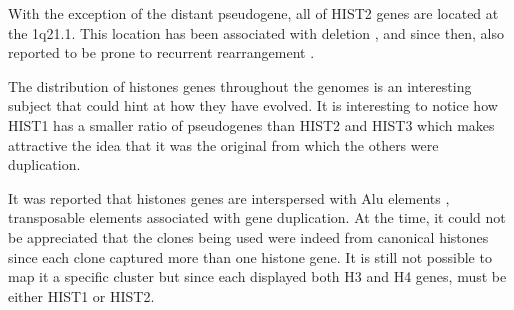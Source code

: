 
    With the exception of the distant pseudogene, all of HIST2 genes are located
    at the 1q21.1. This location has been associated with deletion
    \citep{HISTTwo-prone-deletion-discovery}, and since then, also reported to be prone
    to recurrent rearrangement \citep{HISTTwo-prone-deletion-focus}.


    The distribution of histones genes throughout the genomes is an interesting
    subject that could hint at how they have evolved. It is interesting to
    notice how HIST1 has a smaller ratio of pseudogenes than HIST2 and HIST3
    which makes attractive the idea that it was the original from which
    the others were duplication.


    It was reported that histones genes are interspersed with Alu
    elements \citep{histone-alu}, transposable elements associated with gene
    duplication. At the time, it could not be appreciated that the clones
    being used were indeed from canonical histones since each clone captured
    more than one histone gene. It is still not possible to map it a specific
    cluster but since each displayed both H3 and H4 genes, must be either
    HIST1 or HIST2.

